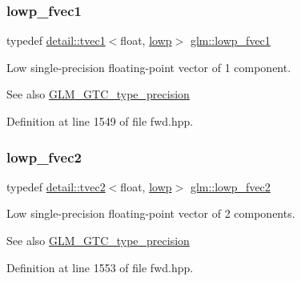 \subsubsection{\texorpdfstring{lowp\+\_\+fvec1}{lowp\_fvec1}}
{\footnotesize\ttfamily typedef \hyperlink{structglm_1_1detail_1_1tvec1}{detail\+::tvec1}$<$float, \hyperlink{namespaceglm_a0f04f086094c747d227af4425893f545ae161af3fc695e696ce3bf69f7332bc2d}{lowp}$>$ \hyperlink{group__gtc__type__precision_gad5266f0507395cf8cdfe84b9cf5496e4}{glm\+::lowp\+\_\+fvec1}}

Low single-\/precision floating-\/point vector of 1 component. \begin{DoxySeeAlso}{See also}
\hyperlink{group__gtc__type__precision}{G\+L\+M\+\_\+\+G\+T\+C\+\_\+type\+\_\+precision} 
\end{DoxySeeAlso}


Definition at line 1549 of file fwd.\+hpp.

\mbox{\label{group__gtc__type__precision_gaf365442c52322b810bc0ed943e539229}} 
\subsubsection{\texorpdfstring{lowp\+\_\+fvec2}{lowp\_fvec2}}
{\footnotesize\ttfamily typedef \hyperlink{structglm_1_1detail_1_1tvec2}{detail\+::tvec2}$<$float, \hyperlink{namespaceglm_a0f04f086094c747d227af4425893f545ae161af3fc695e696ce3bf69f7332bc2d}{lowp}$>$ \hyperlink{group__gtc__type__precision_gaf365442c52322b810bc0ed943e539229}{glm\+::lowp\+\_\+fvec2}}

Low single-\/precision floating-\/point vector of 2 components. \begin{DoxySeeAlso}{See also}
\hyperlink{group__gtc__type__precision}{G\+L\+M\+\_\+\+G\+T\+C\+\_\+type\+\_\+precision} 
\end{DoxySeeAlso}


Definition at line 1553 of file fwd.\+hpp.

\mbox{\label{group__gtc__type__precision_ga83d77dfe136d4add9e214cd205320c12}} 
